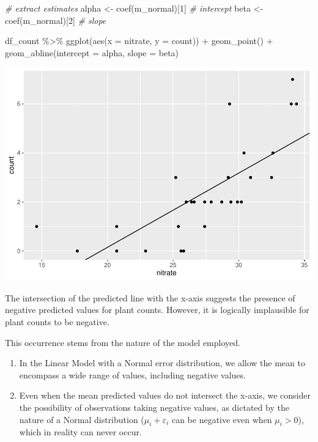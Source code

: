 \documentclass[
]{book}
\newenvironment{Shaded}{\begin{snugshade}}{\end{snugshade}}
\newcommand{\AttributeTok}[1]{\textcolor[rgb]{0.77,0.63,0.00}{#1}}
\newcommand{\CommentTok}[1]{\textcolor[rgb]{0.56,0.35,0.01}{\textit{#1}}}
\newcommand{\DecValTok}[1]{\textcolor[rgb]{0.00,0.00,0.81}{#1}}
\newcommand{\FunctionTok}[1]{\textcolor[rgb]{0.00,0.00,0.00}{#1}}
\newcommand{\NormalTok}[1]{#1}
\newcommand{\OtherTok}[1]{\textcolor[rgb]{0.56,0.35,0.01}{#1}}
\newcommand{\SpecialCharTok}[1]{\textcolor[rgb]{0.00,0.00,0.00}{#1}}
\providecommand{\tightlist}{%
  \setlength{\itemsep}{0pt}\setlength{\parskip}{0pt}}
\begin{document}
\begin{Shaded}
\begin{Highlighting}[]
\CommentTok{\# extract estimates}
\NormalTok{alpha }\OtherTok{\textless{}{-}} \FunctionTok{coef}\NormalTok{(m\_normal)[}\DecValTok{1}\NormalTok{] }\CommentTok{\# intercept}
\NormalTok{beta }\OtherTok{\textless{}{-}} \FunctionTok{coef}\NormalTok{(m\_normal)[}\DecValTok{2}\NormalTok{] }\CommentTok{\# slope}

\NormalTok{df\_count }\SpecialCharTok{\%\textgreater{}\%} 
  \FunctionTok{ggplot}\NormalTok{(}\FunctionTok{aes}\NormalTok{(}\AttributeTok{x =}\NormalTok{ nitrate,}
             \AttributeTok{y =}\NormalTok{ count)) }\SpecialCharTok{+}
  \FunctionTok{geom\_point}\NormalTok{() }\SpecialCharTok{+}
  \FunctionTok{geom\_abline}\NormalTok{(}\AttributeTok{intercept =}\NormalTok{ alpha,}
              \AttributeTok{slope =}\NormalTok{ beta)}
\end{Highlighting}
\end{Shaded}

\begin{center}\includegraphics{_main_files/figure-latex/unnamed-chunk-59-1} \end{center}

The intersection of the predicted line with the x-axis suggests the presence of negative predicted values for plant counts. However, it is logically implausible for plant counts to be negative.

This occurrence stems from the nature of the model employed.

\begin{enumerate}
\def\labelenumi{\arabic{enumi}.}
\tightlist
\item
  In the Linear Model with a Normal error distribution, we allow the mean to encompass a wide range of values, including negative values.
\item
  Even when the mean predicted values do not intersect the x-axis, we consider the possibility of observations taking negative values, as dictated by the nature of a Normal distribution (\(\mu_i + \varepsilon_i\) can be negative even when \(\mu_i > 0\)), which in reality can never occur.
\end{enumerate}
\end{document}
